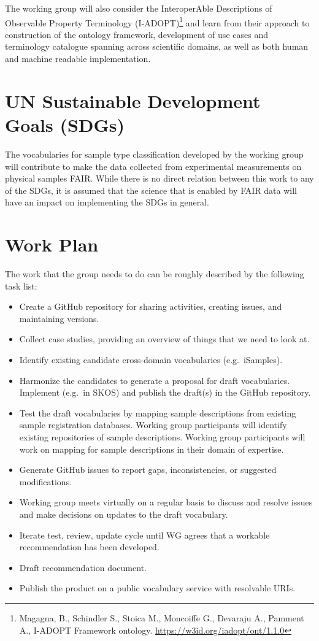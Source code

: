 \documentclass{scrartcl}
\begin{document}
The working group will also consider the InteroperAble Descriptions of
Observable Property Terminology (I-ADOPT)\footnote{Magagna, B.,
  Schindler S., Stoica M., Moncoiffe G., Devaraju A., Pamment A.,
  I-ADOPT Framework ontology.
  \url{https://w3id.org/iadopt/ont/1.1.0}}
and learn from their approach to construction of the ontology
framework, development of use cases and terminology catalogue spanning
across scientific domains, as well as both human and machine readable
implementation.

\section{UN Sustainable Development Goals (SDGs)}

The vocabularies for sample type classification developed by the
working group will contribute to make the data collected from
experimental measurements on physical samples FAIR.  While there is no
direct relation between this work to any of the SDGs, it is assumed
that the science that is enabled by FAIR data will have an impact on
implementing the SDGs in general.

\section{Work Plan}

The work that the group needs to do can be roughly described by the
following task list:
\begin{itemize}
\item Create a GitHub repository for sharing activities, creating
  issues, and maintaining versions.
\item Collect case studies, providing an overview of things that we need
  to look at.
\item Identify existing candidate cross-domain vocabularies
  (e.g.\ iSamples).
\item Harmonize the candidates to generate a proposal for draft
  vocabularies.  Implement (e.g.\ in SKOS) and publish the draft(s) in
  the GitHub repository.
\item Test the draft vocabularies by mapping sample descriptions from
  existing sample registration databases.  Working group participants
  will identify existing repositories of sample descriptions.  Working
  group participants will work on mapping for sample descriptions in
  their domain of expertise.
\item Generate GitHub issues to report gaps, inconsistencies, or
  suggested modifications.
\item Working group meets virtually on a regular basis to discuss and
  resolve issues and make decisions on updates to the draft
  vocabulary.
\item Iterate test, review, update cycle until WG agrees that a
  workable recommendation has been developed.
\item Draft recommendation document.
\item Publish the product on a public vocabulary service with
  resolvable URIs.
\end{itemize}
\end{document}
